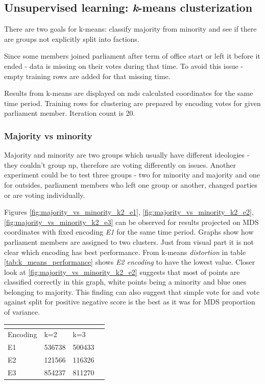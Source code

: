 \documentclass[a4paper,12pt]{article}
\begin{document}
	\clearpage
	
	\subsection{Unsupervised learning: {\textit k-means} clusterization }
	
	
	There are two goals for \gls{k-means}: classify majority from minority and see if there are groups not explicitly split into factions.
	
	Since some members joined parliament after term of office start or left it before it ended - data is missing on their votes during that time. To avoid this issue - empty training rows are added for that missing time.
	
	Results from \gls{k-means} are displayed on \acrshort{mds} calculated coordinates for the same time period. Training rows for clustering are prepared by encoding votes for given parliament member. Iteration count is 20.
	
	\subsubsection{Majority vs minority} 
	
	Majority and minority are two groups which usually have different ideologies - they couldn't group up, therefore are voting differently on issues. Another experiment could be to test three groups - two for minority and majority and one for outsides, parliament members who left one group or another, changed parties or are voting individually.
	
	Figures \ref{fig:majority_vs_minority_k2_e1}, \ref{fig:majority_vs_minority_k2_e2}, \ref{fig:majority_vs_minority_k2_e3} can be observed for results projected on MDS coordinates with fixed encoding \textit{E1} for the same time period. Graphs show how parliament members are assigned to two clusters. Just from visual part it is not clear which encoding has best performance. From \Gls{k-means} \textit{distortion} in table \ref{tab:k_means_performance} shows \textit{E2 encoding} to have the lowest value. Closer look at \ref{fig:majority_vs_minority_k2_e2} suggests that most of points are classified correctly in this graph, white points being a minority and blue ones belonging to majority. This finding can also suggest that simple vote for and vote against split for positive negative score is the best as it was for MDS proportion of variance.
	
	
	\noindent
	\begin{center}
		 \label{tab:k_means_performance}
		\begin{tabular}{L{3cm} C{2cm} C{2cm} C{2cm}}
			\\ 
			\hline
			Encoding & k=2 & k=3 \\\hline
			E1 & 536738 & 500433 \\
			E2 & 121566 & 116326 \\
			E3 & 854237 & 811270 \\
			\hline
		\end{tabular}
	\end{center} 
	
\end{document}
